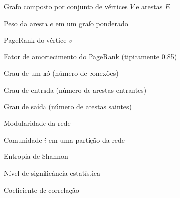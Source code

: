\begin{simbolos}
  \item[$ G = (V, E) $] Grafo composto por conjunto de vértices $V$ e arestas $E$
  \item[$ w(e) $] Peso da aresta $e$ em um grafo ponderado
  \item[$ PR(v) $] PageRank do vértice $v$
  \item[$ d $] Fator de amortecimento do PageRank (tipicamente 0.85)
  \item[$ k $] Grau de um nó (número de conexões)
  \item[$ k_{in} $] Grau de entrada (número de arestas entrantes)
  \item[$ k_{out} $] Grau de saída (número de arestas saintes)
  \item[$ Q $] Modularidade da rede
  \item[$ C_i $] Comunidade $i$ em uma partição da rede
  \item[$ H $] Entropia de Shannon
  \item[$ \alpha $] Nível de significância estatística
  \item[$ \rho $] Coeficiente de correlação
\end{simbolos}